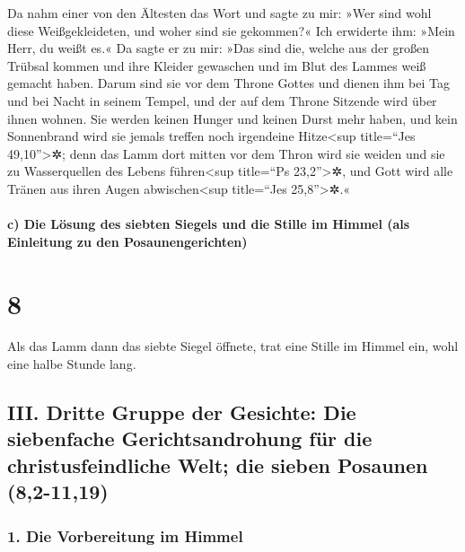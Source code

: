  Da nahm einer von den Ältesten das Wort und sagte zu
mir: »Wer sind wohl diese Weißgekleideten, und woher sind sie gekommen?«
 Ich erwiderte ihm: »Mein Herr, du weißt es.« Da sagte er
zu mir: »Das sind die, welche aus der großen Trübsal kommen und ihre
Kleider gewaschen und im Blut des Lammes weiß gemacht haben.
 Darum sind sie vor dem Throne Gottes und dienen ihm bei
Tag und bei Nacht in seinem Tempel, und der auf dem Throne Sitzende wird
über ihnen wohnen.  Sie werden keinen Hunger und keinen
Durst mehr haben, und kein Sonnenbrand wird sie jemals treffen noch
irgendeine Hitze\textless sup title=``Jes 49,10''\textgreater✲;
 denn das Lamm dort mitten vor dem Thron wird sie weiden
und sie zu Wasserquellen des Lebens führen\textless sup title=``Ps
23,2''\textgreater✲, und Gott wird alle Tränen aus ihren Augen
abwischen\textless sup title=``Jes 25,8''\textgreater✲.«

\hypertarget{c-die-luxf6sung-des-siebten-siegels-und-die-stille-im-himmel-als-einleitung-zu-den-posaunengerichten}{%
\paragraph{c) Die Lösung des siebten Siegels und die Stille im Himmel
(als Einleitung zu den
Posaunengerichten)}\label{c-die-luxf6sung-des-siebten-siegels-und-die-stille-im-himmel-als-einleitung-zu-den-posaunengerichten}}

\hypertarget{section-7}{%
\section{8}\label{section-7}}

 Als das Lamm dann das siebte Siegel öffnete, trat eine
Stille im Himmel ein, wohl eine halbe Stunde lang.

\hypertarget{iii.-dritte-gruppe-der-gesichte-die-siebenfache-gerichtsandrohung-fuxfcr-die-christusfeindliche-welt-die-sieben-posaunen-82-1119}{%
\subsection{III. Dritte Gruppe der Gesichte: Die siebenfache
Gerichtsandrohung für die christusfeindliche Welt; die sieben Posaunen
(8,2-11,19)}\label{iii.-dritte-gruppe-der-gesichte-die-siebenfache-gerichtsandrohung-fuxfcr-die-christusfeindliche-welt-die-sieben-posaunen-82-1119}}

\hypertarget{die-vorbereitung-im-himmel}{%
\subsubsection{1. Die Vorbereitung im
Himmel}\label{die-vorbereitung-im-himmel}}

